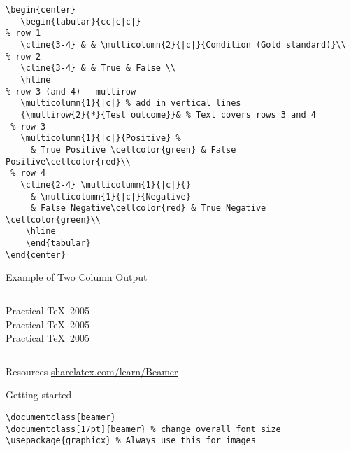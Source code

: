 \documentclass{beamer}
\begin{document}
    \begin{verbatim}
\begin{center}
   \begin{tabular}{cc|c|c|}
% row 1
   \cline{3-4} & & \multicolumn{2}{|c|}{Condition (Gold standard)}\\
% row 2
   \cline{3-4} & & True & False \\
   \hline
% row 3 (and 4) - multirow
   \multicolumn{1}{|c|} % add in vertical lines
   {\multirow{2}{*}{Test outcome}}& % Text covers rows 3 and 4
 % row 3
   \multicolumn{1}{|c|}{Positive} %
     & True Positive \cellcolor{green} & False Positive\cellcolor{red}\\
 % row 4
   \cline{2-4} \multicolumn{1}{|c|}{}
     & \multicolumn{1}{|c|}{Negative}
     & False Negative\cellcolor{red} & True Negative \cellcolor{green}\\
    \hline
    \end{tabular}
\end{center}
    \end{verbatim}
\begin{frame}{Example of Two Column Output}
    \begin{columns}[c]
        \column{1.5in}
            Practical \TeX\ 2005\\
            Practical \TeX\ 2005\\
            Practical \TeX\ 2005
        \column{1.5in}
    \end{columns}
\end{frame}%
\begin{frame}{Resources}
    \url{sharelatex.com/learn/Beamer}
\end{frame}
\begin{frame}[fragile=singleslide]{Getting started}
\begin{verbatim}
\documentclass{beamer}
\documentclass[17pt]{beamer} % change overall font size
\usepackage{graphicx} % Always use this for images
\end{verbatim}
\end{frame}
\end{document}
